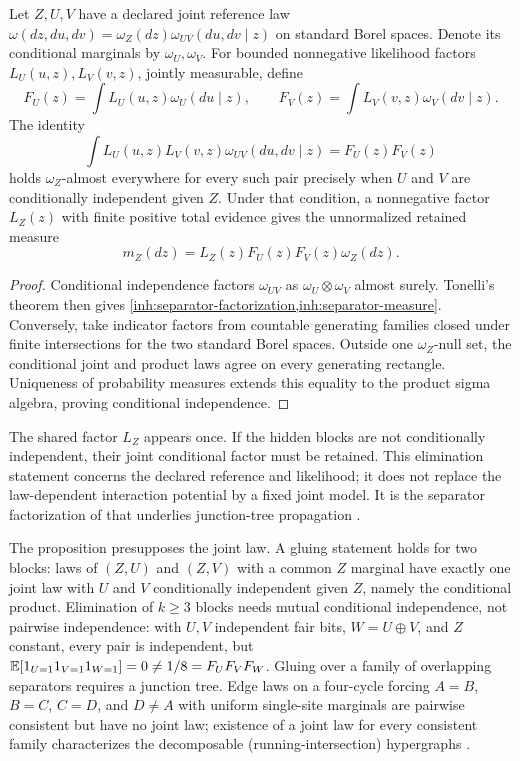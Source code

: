 Let $Z,U,V$ have a declared joint reference law
$\omega(dz,du,dv)=\omega_Z(dz)\omega_{UV}(du,dv\mid z)$ on standard Borel
spaces. Denote its conditional marginals by $\omega_U,\omega_V$. For
bounded nonnegative likelihood factors $L_U(u,z),L_V(v,z)$, jointly
measurable, define
\begin{equation}
 F_U(z)=\int L_U(u,z)\omega_U(du\mid z),
 \qquad F_V(z)=\int L_V(v,z)\omega_V(dv\mid z).
\end{equation}
The identity
\begin{equation}
 \int L_U(u,z)L_V(v,z)\omega_{UV}(du,dv\mid z)
 =F_U(z)F_V(z)
 \label{inh:separator-factorization}
\end{equation}
holds $\omega_Z$-almost everywhere for every such pair precisely when
$U$ and $V$ are conditionally independent given $Z$.
Under that condition, a nonnegative factor $L_Z(z)$ with finite positive
total evidence gives the unnormalized retained measure
\begin{equation}
 m_Z(dz)=L_Z(z)F_U(z)F_V(z)\omega_Z(dz).
 \label{inh:separator-measure}
\end{equation}
\begin{proof}
Conditional independence factors $\omega_{UV}$ as
$\omega_U\otimes\omega_V$ almost surely. Tonelli's theorem then gives
\cref{inh:separator-factorization,inh:separator-measure}. Conversely,
take indicator factors from countable generating families closed under
finite intersections for the two standard Borel spaces. Outside one
$\omega_Z$-null set, the conditional joint and product laws agree on every
generating rectangle. Uniqueness of probability measures extends this
equality to the product sigma algebra, proving conditional independence.
\end{proof}

The shared factor $L_Z$ appears once. If the hidden blocks are not
conditionally independent, their joint conditional factor must be
retained. This elimination statement concerns the declared reference and
likelihood; it does not replace the law-dependent interaction potential
by a fixed joint model. It is the separator factorization of
\citet{Dawid1979} that underlies junction-tree propagation
\citep{Lauritzen1996}.

The proposition presupposes the joint law. A gluing statement holds for
two blocks: laws of $(Z,U)$ and $(Z,V)$ with a common $Z$ marginal have
exactly one joint law with $U$ and $V$ conditionally independent given $Z$,
namely the conditional product. Elimination of $k\geq3$ blocks needs mutual
conditional independence, not pairwise independence: with $U,V$ independent
fair bits, $W=U\oplus V$, and $Z$ constant, every pair is independent, but
$\mathbb E[1_{U=1}1_{V=1}1_{W=1}]=0\neq1/8=F_UF_VF_W$. Gluing over a family of
overlapping separators requires a junction tree. Edge laws on a four-cycle
forcing $A=B$, $B=C$, $C=D$, and $D\neq A$ with uniform single-site marginals
are pairwise consistent but have no joint law; existence of a joint law for
every consistent family characterizes the decomposable (running-intersection)
hypergraphs \citep{Vorobev1962}.

